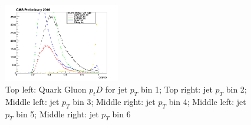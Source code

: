 \begin{figure}[htbp]
\begin{center}
  \includegraphics[width=0.45\textwidth]{sections/mc4/TopTagger/figures/_b_qgptdjetptbin5_.png}
 \end{center}
 \caption{Top left: Quark Gluon $p_{t}D$ for jet $p_{T}$ bin 1; Top right: jet $p_{T}$ bin 2; Middle left: jet $p_{T}$ bin 3; Middle right: jet $p_{T}$ bin 4; Middle left: jet $p_{T}$ bin 5; Middle right: jet $p_{T}$ bin 6}
 \label{fig:c4ttqgptdjetpt}
\end{figure}

